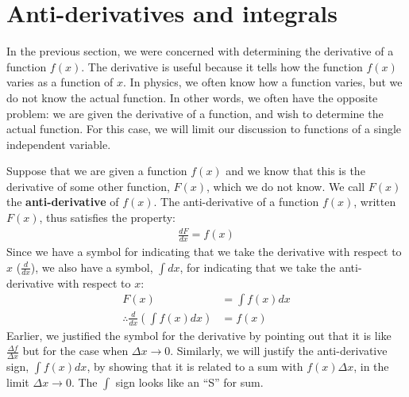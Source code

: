 \section{Anti-derivatives and integrals}
In the previous section, we were concerned with determining the derivative of a function $f(x)$. The derivative is useful because it tells how the function $f(x)$ varies as a function of $x$. In physics, we often know how a function varies, but we do not know the actual function. In other words, we often have the opposite problem: we are given the derivative of a function, and wish to determine the actual function. For this case, we will limit our discussion to functions of a single independent variable.

Suppose that we are given a function $f(x)$ and we know that this is the derivative of some other function, $F(x)$, which we do not know. We call $F(x)$ the \textbf{anti-derivative} of $f(x)$. The anti-derivative of a function $f(x)$, written $F(x)$, thus satisfies the property:
\begin{align*}
\frac{dF}{dx}=f(x)
\end{align*}
Since we have a symbol for indicating that we take the derivative with respect to $x$ ($\frac{d}{dx}$), we also have a symbol, $\int dx$, for indicating that we take the anti-derivative with respect to $x$:
\begin{align*}
F(x) &= \int f(x) dx \\
\therefore \frac{d}{dx}\left(\int f(x) dx\right) &= f(x)
\end{align*}
Earlier, we justified the symbol for the derivative by pointing out that it is like $\frac{\Delta f}{\Delta x}$ but for the case when $\Delta x\to 0$. Similarly, we will justify the anti-derivative sign, $\int f(x) dx$, by showing that it is related to a sum with $f(x)\Delta x$, in the limit $\Delta x\to 0$. The $\int$ sign looks like an ``S'' for sum.

